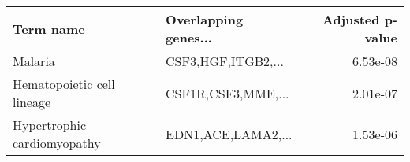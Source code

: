 \begin{tabular}{llr}
\toprule
                  Term name & Overlapping genes... &  Adjusted p-value \\
\midrule
                    Malaria &   CSF3,HGF,ITGB2,... &          6.53e-08 \\
 Hematopoietic cell lineage &   CSF1R,CSF3,MME,... &          2.01e-07 \\
Hypertrophic cardiomyopathy &   EDN1,ACE,LAMA2,... &          1.53e-06 \\
\bottomrule
\end{tabular}
